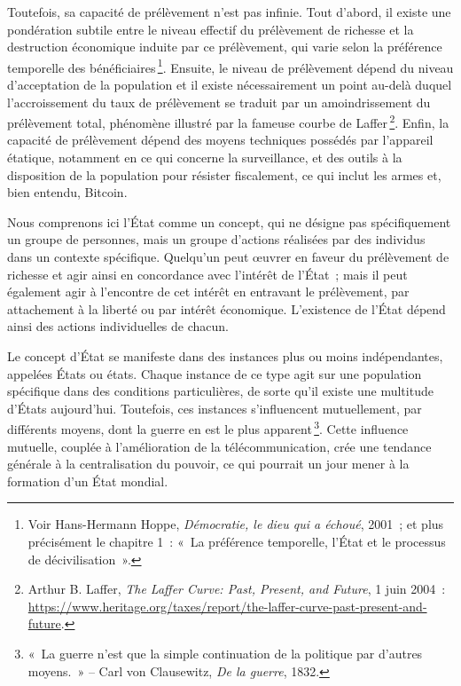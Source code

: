 \documentclass[a4paper,notitlepage]{article}
\newcommand{\eng}[1]{{\NoAutoSpaceBeforeFDP\emph{#1}}}  %
\newcommand{\sfootnote}{\,\footnote}
\begin{document}
Toutefois, sa capacité de prélèvement n'est pas infinie. Tout d'abord, il existe une pondération subtile entre le niveau effectif du prélèvement de richesse et la destruction économique induite par ce prélèvement, qui varie selon la préférence temporelle des bénéficiaires\sfootnote{Voir Hans-Hermann Hoppe, \emph{Démocratie, le dieu qui a échoué}, 2001~; et plus précisément le chapitre 1~: «~La préférence temporelle, l'État et le processus de décivilisation~».}. Ensuite, le niveau de prélèvement dépend du niveau d'acceptation de la population et il existe nécessairement un point au-delà duquel l'accroissement du taux de prélèvement se traduit par un amoindrissement du prélèvement total, phénomène illustré par la fameuse courbe de Laffer\sfootnote{Arthur B. Laffer, \eng{The Laffer Curve: Past, Present, and Future}, 1\ier{} juin 2004~: \url{https://www.heritage.org/taxes/report/the-laffer-curve-past-present-and-future}.}. Enfin, la capacité de prélèvement dépend des moyens techniques possédés par l'appareil étatique, notamment en ce qui concerne la surveillance, et des outils à la disposition de la population pour résister fiscalement, ce qui inclut les armes et, bien entendu, Bitcoin.

Nous comprenons ici l'État comme un concept, qui ne désigne pas spécifiquement un groupe de personnes, mais un groupe d'actions réalisées par des individus dans un contexte spécifique. Quelqu'un peut œuvrer en faveur du prélèvement de richesse et agir ainsi en concordance avec l'intérêt de l'État~; mais il peut également agir à l'encontre de cet intérêt en entravant le prélèvement, par attachement à la liberté ou par intérêt économique. L'existence de l'État dépend ainsi des actions individuelles de chacun. %

Le concept d'État se manifeste dans des instances plus ou moins indépendantes, appelées États ou états. Chaque instance de ce type agit sur une population spécifique dans des conditions particulières, de sorte qu'il existe une multitude d'États aujourd'hui. Toutefois, ces instances s'influencent mutuellement, par différents moyens, dont la guerre en est le plus apparent\sfootnote{«~La guerre n'est que la simple continuation de la politique par d'autres moyens.~» -- Carl von Clausewitz, \emph{De la guerre}, 1832.}. Cette influence mutuelle, couplée à l'amélioration de la télécommunication, crée une tendance générale à la centralisation du pouvoir, ce qui pourrait un jour mener à la formation d'un État mondial.
\end{document}
